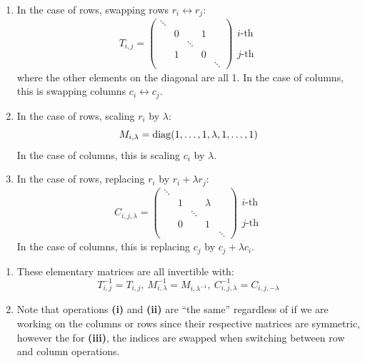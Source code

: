 \documentclass[../main.tex]{subfiles}
\begin{document}
\begin{enumerate}
  \item In the case of rows, swapping rows $r_i \leftrightarrow r_j$:
    \[
      T_{i, j} =
      \begin{pmatrix}
          \ddots & & & & \\
          & 0& & 1 &      \\
          & & \ddots & & \\
          & 1 & & 0 &      \\
          & & & & \ddots
      \end{pmatrix}
      \begin{matrix}
          \phantom{\ddots}\\
          i\text{-th}     \\
          \phantom{\ddots}\\
          j\text{-th}     \\
          \phantom{\ddots}
      \end{matrix}
    \]
    where the other elements on the diagonal are all 1.
    In the case of columns, this is swapping columns $c_i \leftrightarrow c_j$.
  \item In the case of rows, scaling $r_i$ by $\lambda$:
    \[
      M_{i, \lambda} = \operatorname{diag}(1, \ldots, 1, \lambda, 1, \ldots, 1)
    \]
    In the case of columns, this is scaling $c_i$ by $\lambda$.
  \item
    In the case of rows, replacing $r_i$ by $r_i + \lambda r_j$:
    \[
      C_{i, j, \lambda} =
      \begin{pmatrix}
          \ddots & & & & \\
          & 1& & \lambda &      \\
          & & \ddots & & \\
          & 0 & & 1 &      \\
          & & & & \ddots
      \end{pmatrix}
      \begin{matrix}
          \phantom{\ddots}\\
          i\text{-th}     \\
          \phantom{\ddots}\\
          j\text{-th}     \\
          \phantom{\ddots}
      \end{matrix}
    \]
    In the case of columns, this is replacing $c_j$ by $c_j + \lambda c_i$.
\end{enumerate}
\begin{remark}[Remarks]
  \begin{enumerate}
    \item These elementary matrices are all invertible with:
      \[
        T_{i,j}^{-1} = T_{i,j},\ M_{i, \lambda}^{-1} = M_{i, \lambda^{-1}},\ C_{i, j, \lambda}^{-1} = C_{i, j, -\lambda}
      \]
    \item Note that operations \textbf{(i)} and \textbf{(ii)} are ``the same'' regardless of if we are working on the columns or rows since their respective matrices are symmetric, however the for \textbf{(iii)}, the indices are swapped when switching between row and column operations.
  \end{enumerate}
\end{remark}
\end{document}
